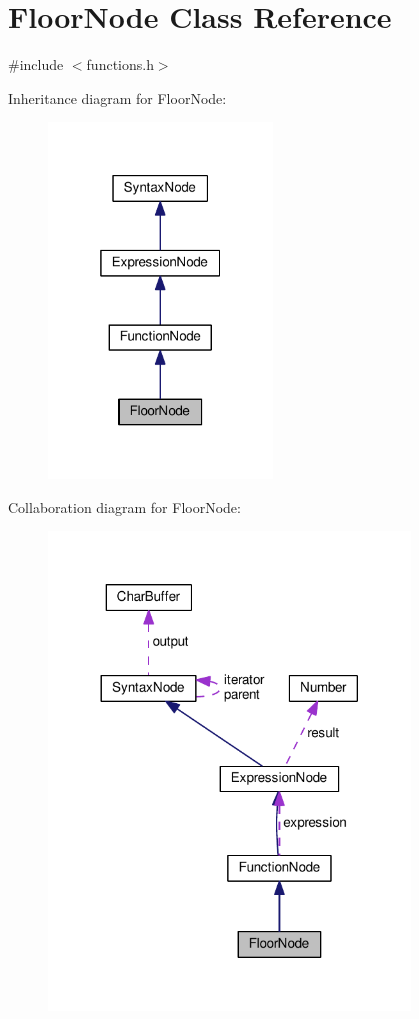 \hypertarget{classFloorNode}{}\section{Floor\+Node Class Reference}
\label{classFloorNode}


{\ttfamily \#include $<$functions.\+h$>$}



Inheritance diagram for Floor\+Node\+:
\nopagebreak
\begin{figure}[H]
\begin{center}
\leavevmode
\includegraphics[width=169pt]{d4/d4d/classFloorNode__inherit__graph}
\end{center}
\end{figure}


Collaboration diagram for Floor\+Node\+:
\nopagebreak
\begin{figure}[H]
\begin{center}
\leavevmode
\includegraphics[width=272pt]{de/d9c/classFloorNode__coll__graph}
\end{center}
\end{figure}
